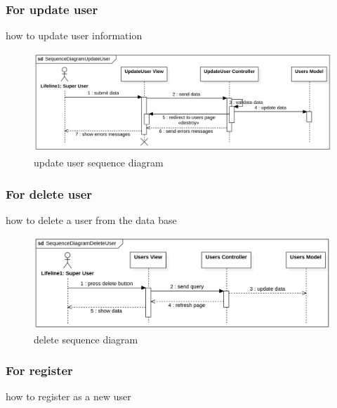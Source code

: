 \documentclass[12pt,a4paper]{article}
\begin{document}
		\subsubsection{For update user}
		how to update user information
		
			\begin{figure}[!h]
				\centering
				\includegraphics[width=\textwidth]{diagrams/update_user_sequence.png}
				\caption{update user sequence diagram}
				\label{fig:update-user-s-d}
			\end{figure}
		
		\subsubsection{For delete user}
		how to delete a user from the data base
		
			\begin{figure}[!h]
				\centering
				\includegraphics[width=\textwidth]{diagrams/delete_user_sequence.png}
				\caption{delete sequence diagram}
				\label{fig:delete-user-s-d}
			\end{figure}
		
		\subsubsection{For register}
		how to register as a new user
		
\end{document}
